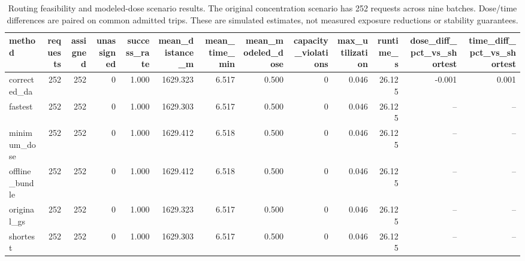 \begin{table}[t]
\centering
\scriptsize
\caption{Routing feasibility and modeled-dose scenario results. The original concentration scenario has 252 requests across nine batches. Dose/time differences are paired on common admitted trips. These are simulated estimates, not measured exposure reductions or stability guarantees.}
\label{tab:t07_routing_feasibility}
\begin{tabular}{lrrrrrrrrrrrr}
\hline
method & requests & assigned & unassigned & success\_rate & mean\_distance\_m & mean\_time\_min & mean\_modeled\_dose & capacity\_violations & max\_utilization & runtime\_s & dose\_diff\_pct\_vs\_shortest & time\_diff\_pct\_vs\_shortest \\
\hline
corrected\_da & 252 & 252 & 0 & 1.000 & 1629.323 & 6.517 & 0.500 & 0 & 0.046 & 26.125 & -0.001 & 0.001 \\
fastest & 252 & 252 & 0 & 1.000 & 1629.303 & 6.517 & 0.500 & 0 & 0.046 & 26.125 & -- & -- \\
minimum\_dose & 252 & 252 & 0 & 1.000 & 1629.412 & 6.518 & 0.500 & 0 & 0.046 & 26.125 & -- & -- \\
offline\_bundle & 252 & 252 & 0 & 1.000 & 1629.412 & 6.518 & 0.500 & 0 & 0.046 & 26.125 & -- & -- \\
original\_gs & 252 & 252 & 0 & 1.000 & 1629.323 & 6.517 & 0.500 & 0 & 0.046 & 26.125 & -- & -- \\
shortest & 252 & 252 & 0 & 1.000 & 1629.303 & 6.517 & 0.500 & 0 & 0.046 & 26.125 & -- & -- \\
\hline
\end{tabular}
\end{table}

